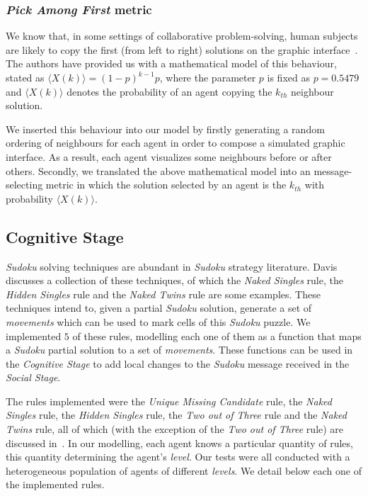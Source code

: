 \documentclass[letterpaper]{article}
\begin{document}
\subsubsection{{\em Pick Among First} metric}

We know that, in some settings of collaborative problem-solving, human subjects are likely to copy the first (from left to right) solutions on the graphic interface~\cite{farenzena:collabem}. The authors have provided us with a mathematical model of this behaviour, stated as $\langle X(k)\rangle = (1-p)^{k-1}p$, where the parameter $p$ is fixed as $p = 0.5479$ and $\langle X(k)\rangle$ denotes the probability of an agent copying the $k_{th}$ neighbour solution.

We inserted this behaviour into our model by firstly generating a random ordering of neighbours for each agent in order to compose a simulated graphic interface. As a result, each agent visualizes some neighbours before or after others. Secondly, we translated the above mathematical model into an message-selecting metric in which the solution selected by an agent is the $k_{th}$ with probability $\langle X(k)\rangle$.

\subsection{Cognitive Stage}

{\em Sudoku} solving techniques are abundant in {\em Sudoku} strategy literature. Davis ~\cite{davis:mathsudoku} discusses a collection of these techniques, of which the {\em Naked Singles} rule, the {\em Hidden Singles} rule and the {\em Naked Twins} rule are some examples. These techniques intend to, given a partial {\em Sudoku} solution, generate a set of {\em movements} which can be used to mark cells of this {\em Sudoku} puzzle. We implemented $5$ of these rules, modelling each one of them as a function that maps a {\em Sudoku} partial solution to a set of {\em movements}. These functions can be used in the {\em Cognitive Stage} to add local changes to the {\em Sudoku} message received in the {\em Social Stage}.

The rules implemented were the {\em Unique Missing Candidate} rule, the {\em Naked Singles} rule, the {\em Hidden Singles} rule, the {\em Two out of Three} rule and the {\em Naked Twins} rule, all of which (with the exception of the {\em Two out of Three} rule) are discussed in~\cite{davis:mathsudoku}. In our modelling, each agent knows a particular quantity of rules, this quantity determining the agent's {\em level}. Our tests were all conducted with a heterogeneous population of agents of different {\em levels}. We detail below each one of the implemented rules.
\end{document}
